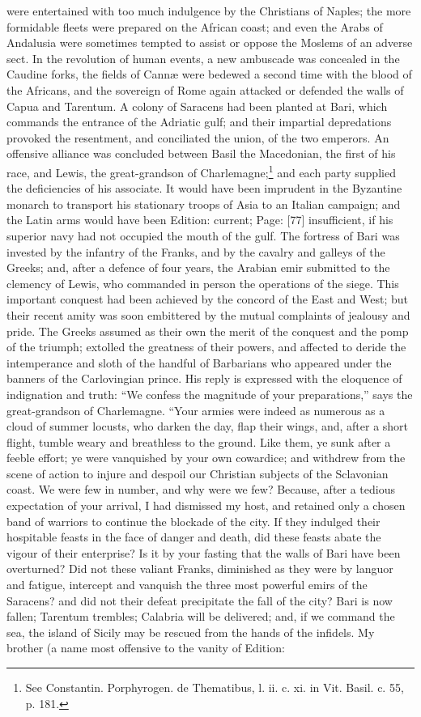 were entertained with too much indulgence by the Christians of Naples; the more formidable fleets were prepared on the African coast; and even the Arabs of Andalusia were sometimes tempted to assist or oppose the Moslems of an adverse sect. In the revolution of human events, a new ambuscade was concealed in the Caudine forks, the fields of Cannæ were bedewed a second time with the blood of the Africans, and the sovereign of Rome again attacked or defended the walls of Capua and Tarentum. A colony of Saracens had been planted at Bari, which commands the entrance of the Adriatic gulf; and their impartial depredations provoked the resentment, and conciliated the union, of the two emperors. An offensive alliance was concluded between Basil the Macedonian, the first of his race, and Lewis, the great-grandson of Charlemagne;\footnote{See Constantin. Porphyrogen. de Thematibus, l. ii. c. xi. in Vit. Basil. c. 55, p. 181.} and each party supplied the deficiencies of his associate. It would have been imprudent in the Byzantine monarch to transport his stationary troops of Asia to an Italian campaign; and the Latin arms would have been Edition: current; Page: [77] insufficient, if his superior navy had not occupied the mouth of the gulf. The fortress of Bari was invested by the infantry of the Franks, and by the cavalry and galleys of the Greeks; and, after a defence of four years, the Arabian emir submitted to the clemency of Lewis, who commanded in person the operations of the siege. This important conquest had been achieved by the concord of the East and West; but their recent amity was soon embittered by the mutual complaints of jealousy and pride. The Greeks assumed as their own the merit of the conquest and the pomp of the triumph; extolled the greatness of their powers, and affected to deride the intemperance and sloth of the handful of Barbarians who appeared under the banners of the Carlovingian prince. His reply is expressed with the eloquence of indignation and truth: \texthebrew{“}We confess the magnitude of your preparations,\texthebrew{}” says the great-grandson of Charlemagne. \texthebrew{“}Your armies were indeed as numerous as a cloud of summer locusts, who darken the day, flap their wings, and, after a short flight, tumble weary and breathless to the ground. Like them, ye sunk after a feeble effort; ye were vanquished by your own cowardice; and withdrew from the scene of action to injure and despoil our Christian subjects of the Sclavonian coast. We were few in number, and why were we few? Because, after a tedious expectation of your arrival, I had dismissed my host, and retained only a chosen band of warriors to continue the blockade of the city. If they indulged their hospitable feasts in the face of danger and death, did these feasts abate the vigour of their enterprise? Is it by your fasting that the walls of Bari have been overturned? Did not these valiant Franks, diminished as they were by languor and fatigue, intercept and vanquish the three most powerful emirs of the Saracens? and did not their defeat precipitate the fall of the city? Bari is now fallen; Tarentum trembles; Calabria will be delivered; and, if we command the sea, the island of Sicily may be rescued from the hands of the infidels. My brother (a name most offensive to the vanity of Edition: 